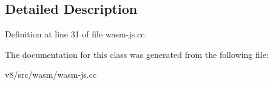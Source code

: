 \subsection{Detailed Description}


Definition at line 31 of file wasm-\/js.\+cc.



The documentation for this class was generated from the following file\+:\begin{DoxyCompactItemize}
\item 
v8/src/wasm/wasm-\/js.\+cc\end{DoxyCompactItemize}
